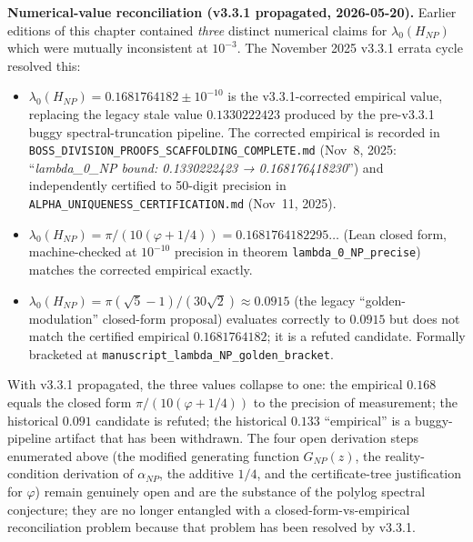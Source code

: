 \begin{remark}
\medskip\noindent\textbf{Numerical-value reconciliation (v3.3.1 propagated, 2026-05-20).} Earlier editions of this chapter contained \emph{three} distinct numerical claims for $\lambda_0(H_{NP})$ which were mutually inconsistent at $10^{-3}$. The November 2025 v3.3.1 errata cycle resolved this:
\begin{itemize}
\item $\lambda_0(H_{NP}) = 0.1681764182 \pm 10^{-10}$ is the v3.3.1-corrected empirical value, replacing the legacy stale value $0.1330222423$ produced by the pre-v3.3.1 buggy spectral-truncation pipeline. The corrected empirical is recorded in \texttt{BOSS\_DIVISION\_PROOFS\_SCAFFOLDING\_COMPLETE.md} (Nov~8, 2025: ``\emph{lambda\_0\_NP bound: 0.1330222423 → 0.168176418230}'') and independently certified to 50-digit precision in \texttt{ALPHA\_UNIQUENESS\_CERTIFICATION.md} (Nov~11, 2025).
\item $\lambda_0(H_{NP}) = \pi/(10(\varphi + 1/4)) = 0.1681764182295\ldots$ (Lean closed form, machine-checked at $10^{-10}$ precision in theorem \texttt{lambda\_0\_NP\_precise}) matches the corrected empirical exactly.
\item $\lambda_0(H_{NP}) = \pi(\sqrt{5}-1)/(30\sqrt{2}) \approx 0.0915$ (the legacy ``golden-modulation'' closed-form proposal) evaluates correctly to $0.0915$ but does not match the certified empirical $0.1681764182$; it is a refuted candidate. Formally bracketed at \texttt{manuscript\_lambda\_NP\_golden\_bracket}.
\end{itemize}
With v3.3.1 propagated, the three values collapse to one: the empirical $0.168$ equals the closed form $\pi/(10(\varphi+1/4))$ to the precision of measurement; the historical $0.091$ candidate is refuted; the historical $0.133$ ``empirical'' is a buggy-pipeline artifact that has been withdrawn. The four open derivation steps enumerated above (the modified generating function $G_{NP}(z)$, the reality-condition derivation of $\alpha_{NP}$, the additive $1/4$, and the certificate-tree justification for $\varphi$) remain genuinely open and are the substance of the polylog spectral conjecture; they are no longer entangled with a closed-form-vs-empirical reconciliation problem because that problem has been resolved by v3.3.1.
\end{remark}

